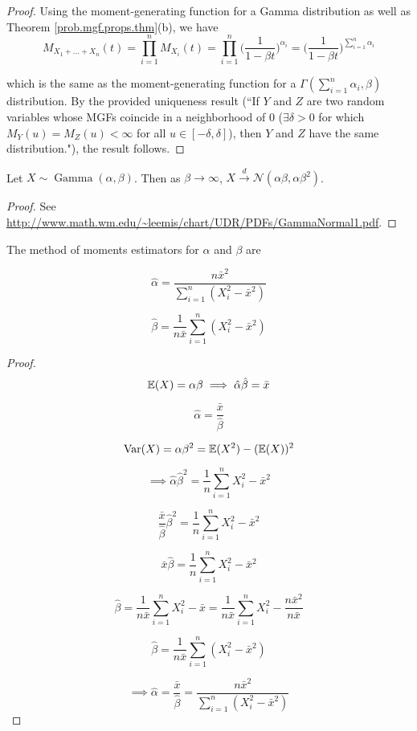 \begin{proof} Using the moment-generating function for a Gamma distribution as well as Theorem \ref{prob.mgf.props.thm}(b), we have
\[
M_{X_1 + \ldots + X_n}(t) = \prod_{i=1}^n M_{X_i}(t) = \prod_{i=1}^n \bigg(\frac{1}{1- \beta t} \bigg)^{\alpha_i} = \bigg(\frac{1}{1- \beta t} \bigg)^{\sum_{i=1}^n \alpha_i}
\]

which is the same as the moment-generating function for a \(\Gamma(\sum_{i=1}^n \alpha_i, \beta)\) distribution. By the provided uniqueness result (``If $Y$ and $Z$ are two random variables whose MGFs coincide in a neighborhood of 0 ($\exists \delta>0$ for which $M_Y(u) =M_Z(u) < \infty$ for all $u\in[-\delta,\delta]$), then $Y$ and $Z$ have the same distribution."), the result follows.
\end{proof}

\begin{proposition}\label{prob.gamma.to.normal}Let \(X \sim \operatorname{Gamma}(\alpha, \beta)\). Then as \(\beta \to \infty\), \(X \xrightarrow{d} \mathcal{N}(\alpha \beta, \alpha \beta^2)\). 

\end{proposition}

\begin{proof}See \url{http://www.math.wm.edu/~leemis/chart/UDR/PDFs/GammaNormal1.pdf}.
\end{proof}

\begin{proposition} The method of moments estimators for \(\alpha\) and \(\beta\) are 

\[
 \hat{\alpha}  = \frac{n \bar{x}^2}{\sum_{i=1}^n (X_i^2 - \bar{x}^2)}
 \]
 
\[
\hat{\beta} = \frac{1}{n\bar{x}}\sum_{i=1}^n (X_i^2 - \bar{x}^2)
\]

\end{proposition}

\begin{proof}
\[
\E(X) = \alpha \beta \implies \hat{\alpha} \hat{\beta} = \bar{x}
\]

\[
\hat{\alpha} = \frac{\bar{x}}{\hat{\beta}}
\]

\[
\Var(X) = \alpha \beta^2 = \E(X^2) - (\E(X))^2
\]

\[
\implies \hat{\alpha} \hat{\beta}^2 = \frac{1}{n}\sum_{i=1}^n X_i^2 - \bar{x}^2
\]

\[
\frac{\bar{x}}{\hat{\beta}} \hat{\beta}^2 = \frac{1}{n}\sum_{i=1}^n X_i^2 - \bar{x}^2
\]

\[
\bar{x}\hat{\beta} = \frac{1}{n}\sum_{i=1}^n X_i^2 - \bar{x}^2
\]

\[
\hat{\beta} = \frac{1}{n\bar{x}}\sum_{i=1}^n X_i^2 - \bar{x} = \frac{1}{n\bar{x}}\sum_{i=1}^n X_i^2 - \frac{n\bar{x}^2}{n\bar{x}} 
\]


\[
\hat{\beta} = \frac{1}{n\bar{x}}\sum_{i=1}^n (X_i^2 - \bar{x}^2)
\]

\[
\implies  \hat{\alpha} =  \frac{\bar{x}}{\hat{\beta}} = \frac{n \bar{x}^2}{\sum_{i=1}^n (X_i^2 - \bar{x}^2)}
\]
\end{proof}

